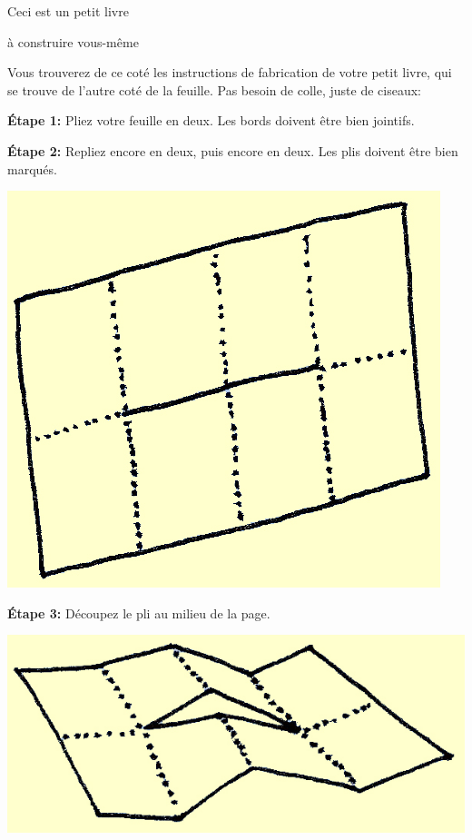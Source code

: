 \documentclass[a4paper,12pt]{article}
\begin{document}
\begin{center}
  {\Huge Ceci est un petit livre}

  {\Large à construire vous-même}
\end{center}

\large

Vous trouverez de ce coté les instructions de fabrication de votre
petit livre, qui se trouve de l'autre coté de la feuille.  Pas besoin
de colle, juste de ciseaux: 

\bigskip\bigskip


\noindent\textbf{Étape 1:} Pliez votre feuille en deux.
Les bords doivent être bien jointifs.

\noindent
\begin{minipage}[b]{.45\linewidth}
\medskip
\noindent\textbf{Étape 2:} Repliez encore en deux, puis encore en deux.  Les plis doivent être
bien marqués.

\medskip \centerline{\includegraphics{img/ptitlivre-etape2.jpg}}

\medskip
\noindent\textbf{Étape 3:} Découpez le pli au milieu de la page.

\medskip \centerline{\includegraphics{img/ptitlivre-etape3.jpg}}


\end{minipage}
\end{document}
